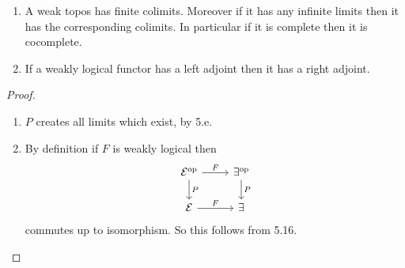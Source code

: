 \documentclass[a4paper]{article}
\begin{document}
\begin{corollary}\leavevmode
  \begin{enumerate}
  \item A weak topos has finite colimits. Moreover if it has any infinite limits then it has the corresponding colimits. In particular if it is complete then it is cocomplete.
  \item If a weakly logical functor has a left adjoint then it has a right adjoint.
  \end{enumerate}
\end{corollary}

\begin{proof}\leavevmode
  \begin{enumerate}
  \item \(P\) creates all limits which exist, by 5.e.
  \item By definition if \(F\) is weakly logical then
    \[
      \begin{tikzcd}
        \mathcal E^{\text{op}} \ar[r, "F"] \ar[d, "P"] & \exists^{\text{op}} \ar[d, "P"] \\
        \mathcal E \ar[r, "F"] & \exists
      \end{tikzcd}
    \]
    commutes up to isomorphism. So this follows from 5.16.
  \end{enumerate}
\end{proof}



\printindex
\end{document}
